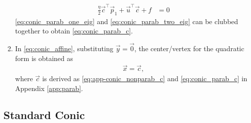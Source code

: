 \begin{enumerate}[label=\thesubsection.\arabic*.,ref=\thesubsection.\theenumi]
\begin{align}
\frac{\eta}{2}\vec{c}^{\top}\vec{p}_1 + \vec{u}^{\top}\vec{c} + f&= 0
\label{eq:conic_parab_two_eig}
\end{align}
\eqref{eq:conic_parab_one_eig} and \eqref{eq:conic_parab_two_eig} can be clubbed together to obtain \eqref{eq:conic_parab_c}.
\item
			In 
			\eqref{eq:conic_affine}, substituting $\vec{y} = \vec{0}$, the center/vertex for the quadratic form is obtained as
    \begin{align}
	    \vec{x} = \vec{c}, 
    \end{align}
			where $\vec{c}$ is derived as 
    \eqref{eq:app-conic_nonparab_c}
    and 
    \eqref{eq:conic_parab_c}
in Appendix  \ref{app:parab}.
		\end{enumerate}
\subsection{Standard Conic}

